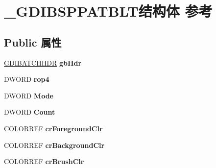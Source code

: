 \hypertarget{struct___g_d_i_b_s_p_p_a_t_b_l_t}{}\section{\+\_\+\+G\+D\+I\+B\+S\+P\+P\+A\+T\+B\+L\+T结构体 参考}
\label{struct___g_d_i_b_s_p_p_a_t_b_l_t}
\subsection*{Public 属性}
\begin{DoxyCompactItemize}
\item 
\mbox{\label{struct___g_d_i_b_s_p_p_a_t_b_l_t_ab8eddb3269c6e5f95d451ee4d71d2ea7}} 
\hyperlink{struct___g_d_i_b_a_t_c_h_h_d_r}{G\+D\+I\+B\+A\+T\+C\+H\+H\+DR} {\bfseries gb\+Hdr}
\item 
\mbox{\label{struct___g_d_i_b_s_p_p_a_t_b_l_t_a26cdcbe413bf19dd22a6d54bdb9a9c25}} 
D\+W\+O\+RD {\bfseries rop4}
\item 
\mbox{\label{struct___g_d_i_b_s_p_p_a_t_b_l_t_a928863d1d492578d263fd880a1461dc2}} 
D\+W\+O\+RD {\bfseries Mode}
\item 
\mbox{\label{struct___g_d_i_b_s_p_p_a_t_b_l_t_a6a63bacc18df77f7cdfacc6d97982ef9}} 
D\+W\+O\+RD {\bfseries Count}
\item 
\mbox{\label{struct___g_d_i_b_s_p_p_a_t_b_l_t_a650ed512116076fd85179366a997f7c3}} 
C\+O\+L\+O\+R\+R\+EF {\bfseries cr\+Foreground\+Clr}
\item 
\mbox{\label{struct___g_d_i_b_s_p_p_a_t_b_l_t_ad5d8c8e47792c59d0ec0fe530e6ce19a}} 
C\+O\+L\+O\+R\+R\+EF {\bfseries cr\+Background\+Clr}
\item 
\mbox{\label{struct___g_d_i_b_s_p_p_a_t_b_l_t_ae5637bd9b0ee522889ccd38c768e4a80}} 
C\+O\+L\+O\+R\+R\+EF {\bfseries cr\+Brush\+Clr}
\item 
\mbox{\label{struct___g_d_i_b_s_p_p_a_t_b_l_t_a2a742aac04502ae15a7d6fc9ccd9195e}} 

\end{DoxyCompactItemize}
